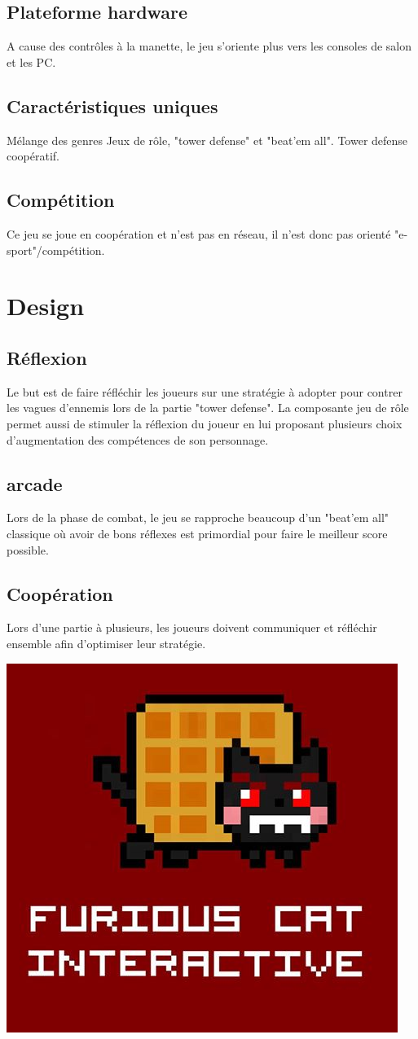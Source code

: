 \documentclass[12pt]{article}
\begin{document}
\subsection{Plateforme hardware}
A cause des contrôles à la manette, le jeu s'oriente plus vers les consoles de salon et les PC.
\subsection{Caractéristiques uniques}
Mélange des genres Jeux de rôle, "tower defense" et "beat'em all".
Tower defense coopératif.
\subsection{Compétition}
Ce jeu se joue en coopération et n'est pas en réseau, il n'est donc pas orienté "e-sport"/compétition.


\section{Design}
\subsection{Réflexion}
Le but est de faire réfléchir les joueurs sur une stratégie à adopter pour contrer les vagues d'ennemis lors de la partie "tower defense". La composante jeu de rôle permet aussi de stimuler la réflexion du joueur en lui proposant plusieurs choix d'augmentation des compétences de son personnage.
\subsection{arcade}
Lors de la phase de combat, le jeu se rapproche beaucoup d'un "beat'em all" classique où avoir de bons réflexes est primordial pour faire le meilleur score possible.
\subsection{Coopération}
Lors d'une partie à plusieurs, les joueurs doivent communiquer et réfléchir ensemble afin d'optimiser leur stratégie.

\begin{center}
  \includegraphics[scale = 0.2]{photo.jpg}
\end{center}
\end{document}
